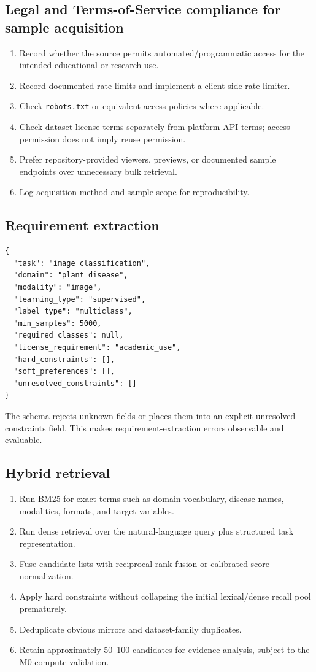 \documentclass[11pt]{article}
\begin{document}
\subsection{Legal and Terms-of-Service compliance for sample acquisition}
\begin{enumerate}[leftmargin=*]
\item Record whether the source permits automated/programmatic access for the intended educational or
      research use.
\item Record documented rate limits and implement a client-side rate limiter.
\item Check \texttt{robots.txt} or equivalent access policies where applicable.
\item Check dataset license terms separately from platform API terms; access permission does not imply
      reuse permission.
\item Prefer repository-provided viewers, previews, or documented sample endpoints over unnecessary bulk
      retrieval.
\item Log acquisition method and sample scope for reproducibility.
\end{enumerate}

\subsection{Requirement extraction}
\begin{lstlisting}[basicstyle=\ttfamily\footnotesize]
{
  "task": "image classification",
  "domain": "plant disease",
  "modality": "image",
  "learning_type": "supervised",
  "label_type": "multiclass",
  "min_samples": 5000,
  "required_classes": null,
  "license_requirement": "academic_use",
  "hard_constraints": [],
  "soft_preferences": [],
  "unresolved_constraints": []
}
\end{lstlisting}
The schema rejects unknown fields or places them into an explicit unresolved-constraints field. This makes
requirement-extraction errors observable and evaluable.

\subsection{Hybrid retrieval}
\begin{enumerate}[leftmargin=*]
\item Run BM25 for exact terms such as domain vocabulary, disease names, modalities, formats, and target
      variables.
\item Run dense retrieval over the natural-language query plus structured task representation.
\item Fuse candidate lists with reciprocal-rank fusion or calibrated score normalization.
\item Apply hard constraints without collapsing the initial lexical/dense recall pool prematurely.
\item Deduplicate obvious mirrors and dataset-family duplicates.
\item Retain approximately 50--100 candidates for evidence analysis, subject to the M0 compute validation.
\end{enumerate}
\end{document}
